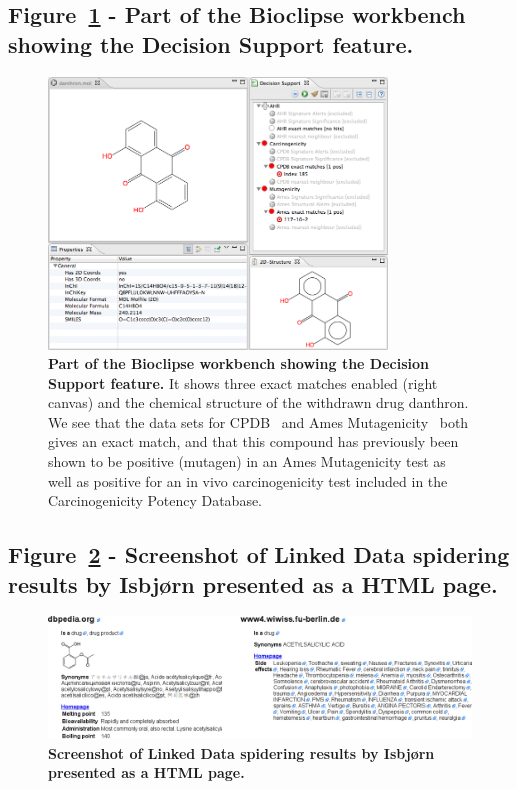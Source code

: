 \documentclass[10pt]{bmc_article}
\newenvironment{bmcformat}{\fussy\setboolean{publ}{true}}{\fussy}
\begin{document}
\begin{bmcformat}
\subsection*{Figure~\ref{fig:danth-ds} - Part of the Bioclipse workbench showing the Decision Support feature.}


\begin{figure}[!hb]
\begin{center}
	\includegraphics[width=9cm]{danthron-ds.png}
\caption{\textbf{Part of the Bioclipse workbench showing the Decision Support feature.} It shows three exact matches enabled (right canvas) and the chemical structure of the withdrawn drug danthron. We see that the data sets for CPDB~\cite{Fitzpatrick:2008dp} and Ames Mutagenicity~\cite{Kazius:2005pv} both gives an exact match, and that this compound has previously been shown to be positive (mutagen) in an Ames Mutagenicity test as well as positive for an in vivo carcinogenicity test included in the Carcinogenicity Potency Database.}
\label{fig:danth-ds}
\end{center}
\end{figure}

\newpage

\subsection*{Figure~\ref{fig:isbjorn} - Screenshot of Linked Data spidering results by Isbjørn presented as a HTML page.}

\begin{figure}[!hb]
\begin{center}
	\includegraphics[width=14cm]{isbjornMerged.png}
\caption{\textbf{Screenshot of Linked Data spidering results by Isbjørn presented as a HTML page.}}
\label{fig:isbjorn}
\end{center}
\end{figure}



\end{bmcformat}
\end{document}
